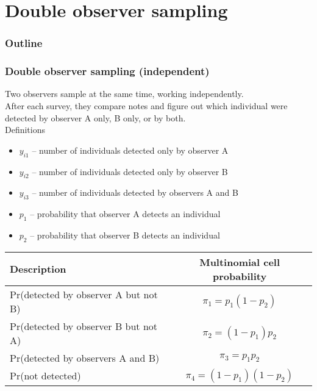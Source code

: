 \documentclass[color=usenames,dvipsnames]{beamer}\usepackage[]{graphicx}\usepackage[]{color}
\begin{document}
\section{Double observer sampling}

\begin{frame}
  \frametitle{Outline}
  \Large
\end{frame}




\begin{frame}
  \frametitle{Double observer sampling (independent)}
  \small
  Two observers sample at the same time, working independently. \\
  \pause
  \vfill
  After each survey, they compare notes and figure out which
  individual were detected by observer A only, B only, or by both. \\
  \pause
  \vfill
  Definitions
  \begin{itemize}
    \setlength\itemsep{1pt}
    \item $y_{i1}$ -- number of individuals detected only by observer A
    \item $y_{i2}$ -- number of individuals detected only by observer B
    \item $y_{i3}$ -- number of individuals detected by observers A and B
    \item $p_1$ -- probability that observer A detects an individual 
    \item $p_2$ -- probability that observer B detects an individual 
  \end{itemize}
  \pause \vfill
  \footnotesize
  \begin{tabular}{lc}
    \hline
    \centering
    Description & Multinomial cell probability \\
    \hline
    Pr(detected by observer A but not B) & $\pi_1 = p_1(1-p_2)$ \\
    Pr(detected by observer B but not A) & $\pi_2 = (1-p_1)p_2$ \\
    Pr(detected by observers A and B) & $\pi_3 = p_1p_2$ \\
    Pr(not detected) & $\pi_4 = (1-p_1)(1-p_2)$ \\
    \hline
  \end{tabular}
\end{frame}
\end{document}
